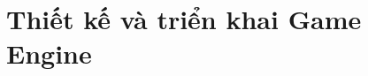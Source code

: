 \section{Thiết kế và triển khai Game Engine}

\begingroup
\titleformat{\paragraph}[hang]{\normalfont\bfseries}{}{0pt}{}
\titlespacing*{\paragraph}{0pt}{8pt}{2pt}







\endgroup
